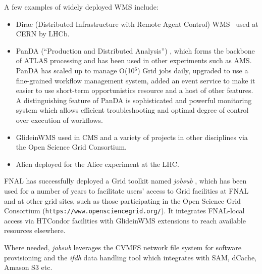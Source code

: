 \noindent
A few examples of widely deployed WMS include:
\begin{itemize}

\item Dirac (Distributed Infrastructure with Remote Agent Control) WMS~\cite{dirac_wms} used at CERN by LHCb.

\item PanDA (``Production and Distributed Analysis'') \cite{panda_chep13}, which forms the backbone of ATLAS processing and has been used in other experiments such as AMS.
PanDA has scaled up to manage O(10$^6$) Grid jobs daily, upgraded to use a fine-grained workflow management system, added an event service to
make it easier to use short-term opportunistics resource and a host of other features. A distinguishing feature of PanDA is sophisticated and powerful
monitoring system which allows efficient troubleshooting and optimal degree of control over execution of workflows.

\item GlideinWMS \cite{glideinwms_chep13} used in CMS and a variety of projects in other disciplines via the Open Science Grid Consortium.

\item Alien \cite{alien} deployed for the Alice experiment at the LHC.

\end{itemize}

\noindent
FNAL has successfully deployed a Grid toolkit named \textit{jobsub} \cite{jobsub_chep13}, which has been used for a number of years to facilitate users' access to
Grid facilities at FNAL and at other grid sites, such as those participating in the Open Science Grid Consortium ({\tt https://www.opensciencegrid.org/}).
It integrates FNAL-local access via HTCondor facilities with GlideinWMS extensions to reach available resources elsewhere.

Where needed, \textit{jobsub} leverages the CVMFS network file system for software provisioning and the \textit{ifdh} data handling tool which integrates
with SAM, dCache, Amason S3 etc.
